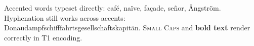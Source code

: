\documentclass{article}
\begin{document}
Accented words typeset directly: caf\'e, na\"ive, fa\c{c}ade, se\~nor, \AA{}ngstr\"om.
Hyphenation still works across accents: Donaudampfschifffahrtsgesellschaftskapit\"an.
{\scshape Small Caps} and {\bfseries bold text} render correctly in T1 encoding.
\end{document}
